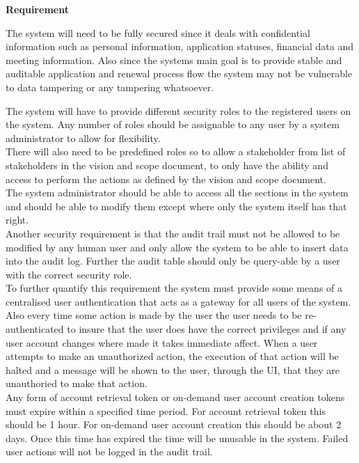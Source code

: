 \begin{flushleft}
\vspace{0.1in}

\textbf{Requirement}

The system will need to be fully secured since it deals with confidential information such as personal information, application statuses, financial data and meeting information. Also since the systems main goal is to provide stable and auditable application and renewal process flow the system may not be vulnerable to data tampering or any tampering whatsoever.\\
\vspace{0.1in}

The system will have to provide different security roles to the registered users on the system. Any number of roles should be assignable to any user by a system administrator to allow for flexibility.\\
There will also need to be predefined roles so to allow a stakeholder from list of stakeholders in the vision and scope document, to only have the ability and access to perform the actions as defined by the vision and scope document.\\
The system administrator should be able to access all the sections in the system and should be able to modify them except where only the system itself has that right.\\
Another security requirement is that the audit trail must not be allowed to be modified by any human user and only allow the system to be able to insert data into the audit log. Further the audit table should only be query-able by a user with the correct security role.\\
To further quantify this requirement the system must provide some means of a centralised user authentication that acts as a gateway for all users of the system. Also every time some action is made by the user the user needs to be re-authenticated to insure that the user does have the correct privileges and if any user account changes where made it takes immediate affect. When a user attempts to make an unauthorized action, the execution of that action will be halted and a message will be shown to the user, through the UI, that they are unauthoried to make that action.\\
Any form of account retrieval token or on-demand user account creation tokens must expire within a specified time period. For account retrieval token this should be 1 hour. For on-demand user account creation this should be about 2 days. Once this time has expired the time will be unusable in the system. Failed user actions will not be logged in the audit trail.
\vspace{0.1in}


\end{flushleft}
